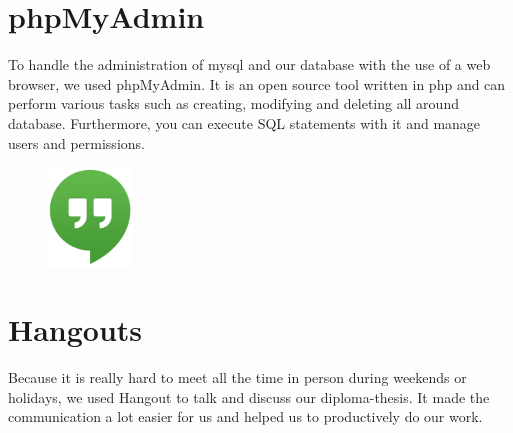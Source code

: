 \section{phpMyAdmin}
To handle the administration of \gls{mysql} and our database with the use of a web browser, we used phpMyAdmin. It is an open source tool written in \gls{php} and can perform various tasks such as creating, modifying and deleting all around database. Furthermore, you can execute SQL statements with it and manage users and permissions.

\begin{figure}
  \begin{center}
    \includegraphics[width=0.2\textwidth] {bilder/hangouts}
  \end{center}
\end{figure}
\section{Hangouts}
Because it is really hard to meet all the time in person during weekends or holidays, we used Hangout to talk and discuss our diploma-thesis. It made the communication a lot easier for us and helped us to productively do our work.
